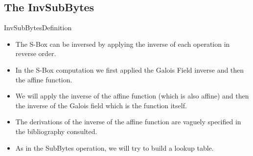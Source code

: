 \subsection{The InvSubBytes}

\begin{frame}[t]{InvSubBytes}{Definition}
	\begin{itemize}
		\item The S-Box can be inversed by applying the inverse of each operation in reverse order.
		\item In the S-Box computation we first applied the Galois Field inverse and then the affine function.
		\item We will apply the inverse of the affine function (which is also affine) and then the inverse of the Galois field which is the function itself.
		\item The derivations of the inverse of the affine function are vaguely specified in the bibliography consulted.
		\item As in the SubBytes operation, we will try to build a lookup table.
	\end{itemize}
	
\end{frame}

